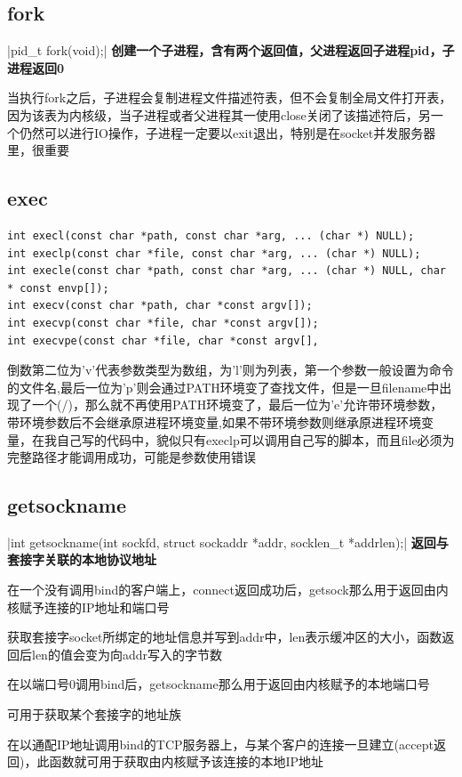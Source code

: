 \subsection{fork}
|pid_t fork(void);|
\noindent \textbf{创建一个子进程，含有两个返回值，父进程返回子进程pid，子进程返回0}
\begin{spacing}{2.0}
当执行fork之后，子进程会复制进程文件描述符表，但不会复制全局文件打开表，因为该表为内核级，当子进程或者父进程其一使用close关闭了该描述符后，另一个仍然可以进行IO操作，子进程一定要以exit退出，特别是在socket并发服务器里，很重要
\end{spacing}
\newpage

\subsection{exec}
\noindent \textbf{}
\begin{verbatim}
int execl(const char *path, const char *arg, ... (char *) NULL); 
int execlp(const char *file, const char *arg, ... (char *) NULL); 
int execle(const char *path, const char *arg, ... (char *) NULL, char * const envp[]); 
int execv(const char *path, char *const argv[]); 
int execvp(const char *file, char *const argv[]); 
int execvpe(const char *file, char *const argv[], 
\end{verbatim}
\begin{spacing}{2.0}
倒数第二位为'v'代表参数类型为数组，为'l'则为列表，第一个参数一般设置为命令的文件名,最后一位为'p'则会通过PATH环境变了查找文件，但是一旦filename中出现了一个(/)，那么就不再使用PATH环境变了，最后一位为'e'允许带环境参数，带环境参数后不会继承原进程环境变量,如果不带环境参数则继承原进程环境变量，在我自己写的代码中，貌似只有execlp可以调用自己写的脚本，而且file必须为完整路径才能调用成功，可能是参数使用错误
\end{spacing}
\newpage

\subsection{getsockname}
|int getsockname(int sockfd, struct sockaddr *addr, socklen_t *addrlen);|
\noindent \textbf{返回与套接字关联的本地协议地址}
\begin{spacing}{2.0}
在一个没有调用bind的客户端上，connect返回成功后，getsock那么用于返回由内核赋予连接的IP地址和端口号

获取套接字socket所绑定的地址信息并写到addr中，len表示缓冲区的大小，函数返回后len的值会变为向addr写入的字节数

在以端口号0调用bind后，getsockname那么用于返回由内核赋予的本地端口号

可用于获取某个套接字的地址族

在以通配IP地址调用bind的TCP服务器上，与某个客户的连接一旦建立(accept返回)，此函数就可用于获取由内核赋予该连接的本地IP地址
\end{spacing}
\newpage


